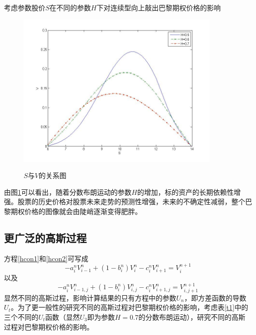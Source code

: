 \documentclass{ctexart} %
\begin{document}
考虑参数股价$S$在不同的参数$H$下对连续型向上敲出巴黎期权价格的影响
\begin{figure}[H]
\begin{center}
\label{paris_fbm}
\includegraphics[width=10cm]{code/paris_fbm.jpg}
\caption{$S$与$V$的关系图}
\end{center}
\end{figure}
由图\ref{paris_fbm}可以看出，随着分数布朗运动的参数$H$的增加，标的资产的长期依赖性增强。股票的历史价格对股票未来走势的预测性增强，未来的不确定性减弱，整个巴黎期权价格的图像就会由陡峭逐渐变得肥胖。
\fi

\subsection{更广泛的高斯过程}
方程\eqref{hcon1}和\eqref{hcon2}可写成
\begin{equation}
-a^n_iV^{n}_{i-1}+(1-b^n_i)V^{n}_i-c^n_iV^{n}_{i+1}=V^{n+1}_i
\end{equation}
以及
\begin{equation}
-a^n_iV^{n}_{i-1,j}+(1-b^n_i)V^{n}_{i,j}-c^n_iV^{n}_{i+1,j}=V^{n+1}_{i,j+1}
\end{equation}
显然不同的高斯过程，影响计算结果的只有方程中的参数$U_n$，即方差函数的导数$U_t$。为了更一般性的研究不同的高斯过程对巴黎期权价格的影响，考虑表\ref{t1}中的三个不同的$U_t$函数（显然$U_3$即为参数$H=0.7$的分数布朗运动），研究不同的高斯过程对巴黎期权价格的影响。
\end{document}
